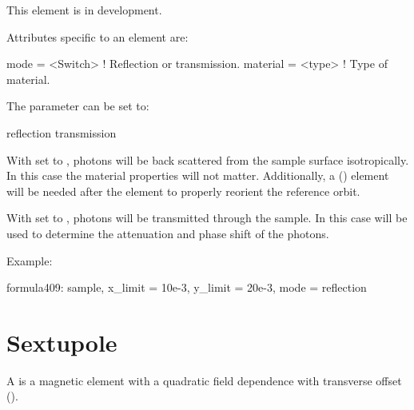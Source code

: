 {This element is in development.

Attributes specific to an  element are:
\begin{example}
  mode       = <Switch> ! Reflection or transmission.
  material   = <type>   ! Type of material. 
\end{example}

The  parameter can be set to:
\begin{example}
  reflection
  transmission
\end{example}
With  set to , photons will be back scattered
from the sample surface isotropically. In this case the material
properties will not matter. Additionally, a 
() element will be needed after the  element
to properly reorient the reference orbit.

With  set to , photons will be transmitted
through the sample. In this case  will be used to
determine the attenuation and phase shift of the photons.

Example:
\begin{example}
  formula409: sample, x_limit = 10e-3, y_limit = 20e-3, mode = reflection
\end{example}

\newpage

\section{Sextupole}
\label{s:sex}

A  is a magnetic element with a quadratic field
dependence with transverse offset ().

}
